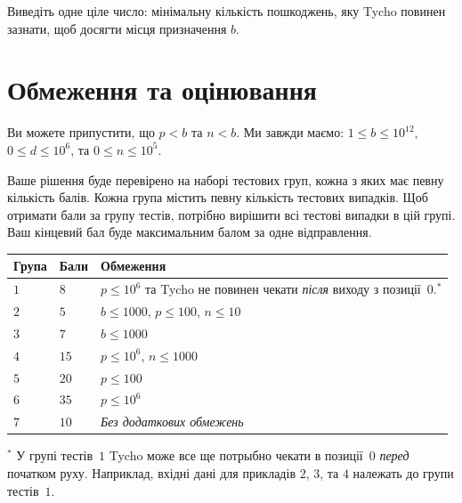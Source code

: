 Виведіть одне ціле число: мінімальну кількість пошкоджень, яку Tycho повинен зазнати, щоб досягти місця призначення $b$.

\section*{Обмеження та оцінювання}

Ви можете припустити, що
$p < b$ %
та
$n < b$. %
Ми завжди маємо:
$1\leq b\leq 10^{12}$, %
$0\leq d \leq 10^6$, %
та
$0\leq n \leq 10^5$. %

Ваше рішення буде перевірено на наборі тестових груп, кожна з яких має певну кількість балів.
Кожна група містить певну кількість тестових випадків.
Щоб отримати бали за групу тестів, потрібно вирішити всі тестові випадки в цій групі.
Ваш кінцевий бал буде максимальним балом за одне відправлення.

\medskip
\begin{tabular}{lll}
Група & Бали & Обмеження \\\hline
  $1$ & $8$  & $p\leq 10^6$ та Tycho не повинен чекати \emph{після} виходу з позиції~$0$.$^*$ \\ %
  $2$ & $5$  & $b\leq 1000$, $p\leq 100$, $n\leq 10$ \\
  $3$ & $7$  & $b\leq 1000$ \\
  $4$ & $15$ & $p\leq 10^6$, $n\leq 1000$\\
  $5$ & $20$ & $p\leq 100$\\
  $6$ & $35$ & $p\leq 10^6$\\
  $7$ & $10$ & \emph{Без додаткових обмежень}
\end{tabular}

\medskip
\noindent $^*$ У групі тестів~$1$ Tycho може все ще потрыбно чекати в позиції~$0$ \emph{перед} початком руху.
Наприклад, вхідні дані для прикладів $2$, $3$, та $4$ належать до групи тестів~$1$.
